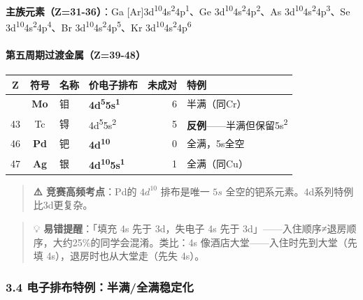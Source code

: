 \documentclass[a4paper,11pt]{ctexart}
\newcounter{none}
\begin{document}
\textbf{主族元素（Z=31-36）}：Ga {[}Ar{]}3d\textsuperscript{10}4s\textsuperscript{2}4p\textsuperscript{1}、Ge 3d\textsuperscript{10}4s\textsuperscript{2}4p\textsuperscript{2}、As 3d\textsuperscript{10}4s\textsuperscript{2}4p\textsuperscript{3}、Se 3d\textsuperscript{10}4s\textsuperscript{2}4p\textsuperscript{4}、Br 3d\textsuperscript{10}4s\textsuperscript{2}4p\textsuperscript{5}、Kr 3d\textsuperscript{10}4s\textsuperscript{2}4p\textsuperscript{6}

\paragraph{第五周期过渡金属（Z=39-48）}\label{ux7b2cux4e94ux5468ux671fux8fc7ux6e21ux91d1ux5c5ez39-48}

{\def\LTcaptype{none} %
\begin{longtable}[]{@{}ccllrl@{}}
\toprule\noalign{}
Z & 符号 & 名称 & 价电子排布 & 未成对 & 特例 \\
\midrule\noalign{}
\endhead
\bottomrule\noalign{}
\endlastfoot
42 & \textbf{Mo} & 钼 & \textbf{4d\textsuperscript{5}5s\textsuperscript{1}} & 6 & 半满（同Cr） \\
43 & Tc & 锝 & 4d\textsuperscript{5}5s\textsuperscript{2} & 5 & \textbf{反例}------半满但保留5s\textsuperscript{2} \\
46 & \textbf{Pd} & 钯 & \textbf{4d\textsuperscript{10}} & 0 & 全满，5s全空 \\
47 & \textbf{Ag} & 银 & \textbf{4d\textsuperscript{10}5s\textsuperscript{1}} & 1 & 全满（同Cu） \\
\end{longtable}
}

\begin{quote}
\textbf{⚠️ 竞赛高频考点}：Pd的 \(4d^{10}\) 排布是唯一 \(5s\) 全空的钯系元素。4d系列特例比3d更复杂。
\end{quote}

\begin{quote}
💡 \textbf{易错提醒}：「填充 4s 先于 3d，失电子 4s 先于 3d」------入住顺序≠退房顺序，大约25\%的同学会混淆。类比：4s 像酒店大堂------入住时先到大堂（先填 4s），退房时也从大堂走（先失 4s）。
\end{quote}

\subsubsection{3.4 电子排布特例：半满/全满稳定化}\label{ux7535ux5b50ux6392ux5e03ux7279ux4f8bux534aux6ee1ux5168ux6ee1ux7a33ux5b9aux5316}
\end{document}
